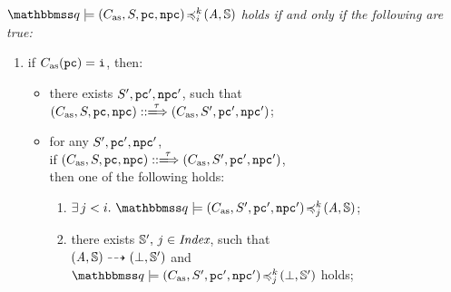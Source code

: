 \begin{definition}
    \em
    \label{def:sim-imp-prim-state}
    $\simFunctionSt{\relastQ}{(\asmimp, \state, \pc, \npc)}{i}{k}{(\primcom, \hpstate)}$
    holds if and only if the following are true:
    \small
    \begin{enumerate}[1.]
        \item if $C_{\text{as}}(\texttt{pc}) = \texttt{i}$, then:
            \begin{itemize}
                \item there exists $S', \texttt{pc}', \texttt{npc}'$,
                    such that \\
                    $\LGlobTrans{(\asmimp, \state, \pc, \npc)}{\empmsg\,}
                        {(\asmimp, \state', \pc', \npc')}$;
                \item for any $S', \texttt{pc}', \texttt{npc}'$, \\
                    if
                    $\LGlobTrans{(\asmimp, \state, \pc, \npc)}{\empmsg\,}
                        {(\asmimp, \state', \pc', \npc')}$, \\ then one of
                        the following holds:
                    \begin{enumerate}
                        \item $\exists \, j < i. \
                            \simFunctionSt{\relastQ}{(\asmimp, \state', \pc', \npc')}
                                {j}{k}{(\primcom, \hpstate)}$;
                        \item there exists $\mathbb{S}', \, j \in \textit{Index}$,
                            such that \\
                            ${(\textit{A}, \mathbb{S})} \dashrightarrow {(\perp, \mathbb{S}')}$
                            and \\
                            $\simFunctionSt{\relastQ}{(\asmimp, \state', \pc', \npc')}
                                {j}{k}{(\primdone, \hpstate')}$ holds;
                    \end{enumerate}
            \end{itemize}
            \vspace{0.5em}


\end{enumerate}
\end{definition}
